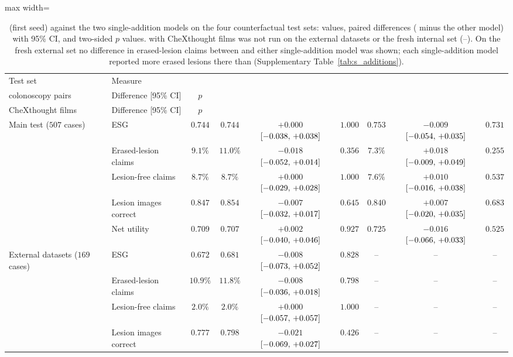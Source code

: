 \begin{table}[!htbp]
\caption{\msn{} (first seed) against the two single-addition models on the four counterfactual test sets: values, paired differences (\msn{} minus the other model) with 95\% CI, and two-sided $p$ values. \msp{} with CheXthought films was not run on the external datasets or the fresh internal set (--). On the fresh external set no difference in erased-lesion claims between \msn{} and either single-addition model was shown; each single-addition model reported more erased lesions there than \msp{} (Supplementary Table~\ref{tab:s_additions}).}
\label{tab:s_next_add}
\centering
\footnotesize
\begin{adjustbox}{max width=\linewidth}
\begin{tabular}{ll c c cc c cc}
\toprule
Test set & Measure & \msn{} & \shortstack{\msp{} with\\colonoscopy pairs} & Difference [95\% CI] & $p$ & \shortstack{\msp{} with\\CheXthought films} & Difference [95\% CI] & $p$ \\
\midrule
Main test ($507$ cases) & ESG & $0.744$ & $0.744$ & $+0.000$ $[-0.038,\,+0.038]$ & $1.000$ & $0.753$ & $-0.009$ $[-0.054,\,+0.035]$ & $0.731$ \\
 & Erased-lesion claims & $9.1\%$ & $11.0\%$ & $-0.018$ $[-0.052,\,+0.014]$ & $0.356$ & $7.3\%$ & $+0.018$ $[-0.009,\,+0.049]$ & $0.255$ \\
 & Lesion-free claims & $8.7\%$ & $8.7\%$ & $+0.000$ $[-0.029,\,+0.028]$ & $1.000$ & $7.6\%$ & $+0.010$ $[-0.016,\,+0.038]$ & $0.537$ \\
 & Lesion images correct & $0.847$ & $0.854$ & $-0.007$ $[-0.032,\,+0.017]$ & $0.645$ & $0.840$ & $+0.007$ $[-0.020,\,+0.035]$ & $0.683$ \\
 & Net utility & $0.709$ & $0.707$ & $+0.002$ $[-0.040,\,+0.046]$ & $0.927$ & $0.725$ & $-0.016$ $[-0.066,\,+0.033]$ & $0.525$ \\
\midrule
External datasets ($169$ cases) & ESG & $0.672$ & $0.681$ & $-0.008$ $[-0.073,\,+0.052]$ & $0.828$ & -- & -- & -- \\
 & Erased-lesion claims & $10.9\%$ & $11.8\%$ & $-0.008$ $[-0.036,\,+0.018]$ & $0.798$ & -- & -- & -- \\
 & Lesion-free claims & $2.0\%$ & $2.0\%$ & $+0.000$ $[-0.057,\,+0.057]$ & $1.000$ & -- & -- & -- \\
 & Lesion images correct & $0.777$ & $0.798$ & $-0.021$ $[-0.069,\,+0.027]$ & $0.426$ & -- & -- & -- \\

\end{tabular}
\end{adjustbox}
\end{table}
